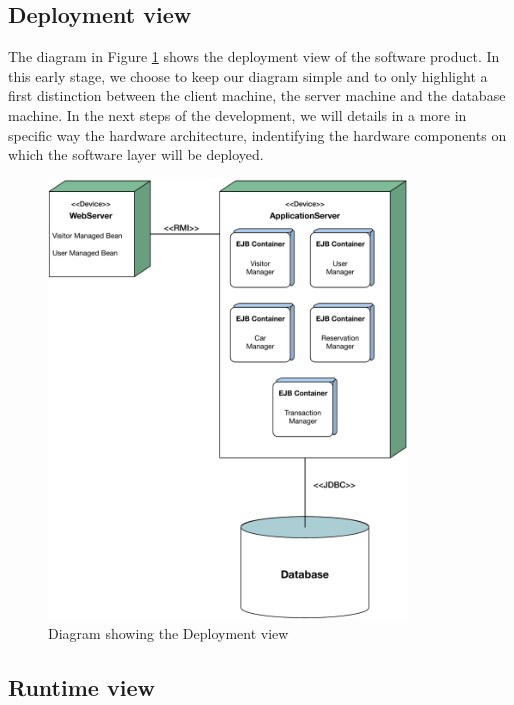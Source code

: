 \subsection{Deployment view} \label{subsec:depl-view}

The diagram in Figure \ref{fig:deployment} shows the deployment view of the software product. In this early stage, we choose to keep our diagram simple and to only highlight a first distinction between the client machine, the server machine and the database machine.
In the next steps of the development, we will details in a more in specific way the hardware architecture, indentifying the hardware components on which the software layer will be deployed.

\begin{figure}[htbp]
\centering
\vspace{12pt}
\includegraphics[width=0.85\textwidth]{Images/Deployment.pdf}
\vspace{10pt}
\caption{Diagram showing the Deployment view}
\label{fig:deployment}
\end{figure}
\clearpage

\subsection{Runtime view} \label{run-view}

